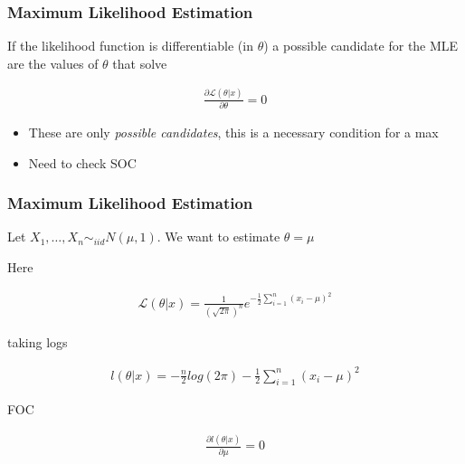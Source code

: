 \documentclass[
  shownotes,
  xcolor={svgnames},
  hyperref={colorlinks,citecolor=DarkBlue,linkcolor=DarkRed,urlcolor=DarkBlue}
  , aspectratio=169]{beamer}
\begin{document}

\begin{frame}[fragile]
\frametitle{Maximum Likelihood Estimation}
If the likelihood function is differentiable (in $\theta$) a possible candidate for the MLE are the values of $\theta$ that solve

\begin{align}
  \frac{\partial \mathcal{L}(\theta|x)}{\partial \theta} = 0
\end{align}

\begin{itemize}
\item These are  only {\it possible candidates}, this is a necessary condition for a max
\item Need to check SOC
\end{itemize}

\end{frame}

\begin{frame}[fragile]
\frametitle{Maximum Likelihood Estimation}

 Let $X_1,\dots,X_n \sim_{iid} N(\mu,1)$. We want to estimate $\theta = \mu$

Here

\begin{align}
\mathcal{L}(\theta |x)=\frac{1}{(\sqrt{2\pi})^{n}}e^{-\frac{1}{2}\sum_{i=1}^{n}(x_i-\mu)^2}
\end{align}


taking logs 

\begin{align}
l\left(\theta |x\right)=-\frac{n}{2}log\left(2\pi\right)-\frac{1}{2}\sum_{i=1}^{n}(x_i-\mu)^2
\end{align}

FOC

\begin{align}
\frac{\partial l\left(\theta |x\right)}{\partial\mu}=0
\end{align}


\end{frame}
\end{document}
